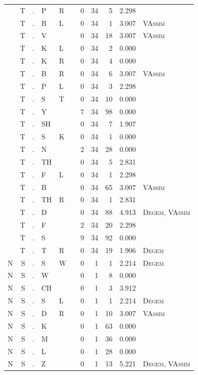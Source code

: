 \documentclass[12pt]{article}
\begin{document}
\begin{longtable}{r@{ } r@{ } c@{ } l@{ } l@{ } l@{ } r r r r l }
 & T & . & P & R &  & 0 & 34 & 5 & 2.298 &  \\
 & T & . & B & L &  & 0 & 34 & 1 & 3.007 & \textsc{VAssim} \\
 & T & . & V &  &  & 0 & 34 & 18 & 3.007 & \textsc{VAssim} \\
 & T & . & K & L &  & 0 & 34 & 2 & 0.000 &  \\
 & T & . & K & R &  & 0 & 34 & 4 & 0.000 &  \\
 & T & . & B & R &  & 0 & 34 & 6 & 3.007 & \textsc{VAssim} \\
 & T & . & P & L &  & 0 & 34 & 3 & 2.298 &  \\
 & T & . & S & T &  & 0 & 34 & 10 & 0.000 &  \\
 & T & . & Y &  &  & 7 & 34 & 98 & 0.000 &  \\
 & T & . & SH &  &  & 0 & 34 & 7 & 1.907 &  \\
 & T & . & S & K &  & 0 & 34 & 1 & 0.000 &  \\
 & T & . & N &  &  & 2 & 34 & 28 & 0.000 &  \\
 & T & . & TH &  &  & 0 & 34 & 5 & 2.831 &  \\
 & T & . & F & L &  & 0 & 34 & 1 & 2.298 &  \\
 & T & . & B &  &  & 0 & 34 & 65 & 3.007 & \textsc{VAssim} \\
 & T & . & TH & R &  & 0 & 34 & 1 & 2.831 &  \\
 & T & . & D &  &  & 0 & 34 & 88 & 4.913 & \textsc{Degem}, \textsc{VAssim} \\
 & T & . & F &  &  & 2 & 34 & 20 & 2.298 &  \\
 & T & . & S &  &  & 9 & 34 & 92 & 0.000 &  \\
 & T & . & T & R &  & 0 & 34 & 19 & 1.906 & \textsc{Degem} \\
N & S & . & S & W &  & 0 & 1 & 1 & 2.214 & \textsc{Degem} \\
N & S & . & W &  &  & 0 & 1 & 8 & 0.000 &  \\
N & S & . & CH &  &  & 0 & 1 & 3 & 3.912 &  \\
N & S & . & S & L &  & 0 & 1 & 1 & 2.214 & \textsc{Degem} \\
N & S & . & D & R &  & 0 & 1 & 10 & 3.007 & \textsc{VAssim} \\
N & S & . & K &  &  & 0 & 1 & 63 & 0.000 &  \\
N & S & . & M &  &  & 0 & 1 & 36 & 0.000 &  \\
N & S & . & L &  &  & 0 & 1 & 28 & 0.000 &  \\
N & S & . & Z &  &  & 0 & 1 & 13 & 5.221 & \textsc{Degem}, \textsc{VAssim} \\

\end{longtable}
\end{document}
